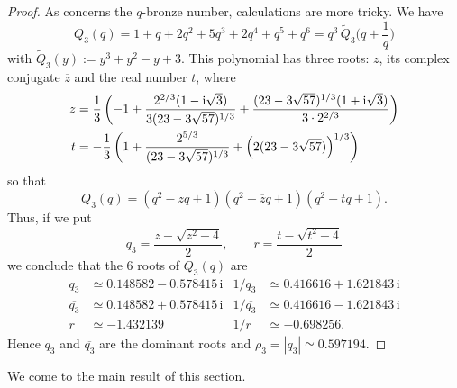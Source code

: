 \documentclass[11pt,reqno]{amsart}
\theoremstyle{plain}
\theoremstyle{definition}
\numberwithin{figure}{section}
\numberwithin{table}{section}
\numberwithin{equation}{section}
\newcommand{\ov}[1]{\overline {#1}}
\newcommand\ip{\ensuremath{\mathrm{i}}}
\let\fr=\frac
\begin{document}
\begin{proof}
As concerns the $q$-bronze number, calculations are more tricky. We have
\begin{equation*}
Q_3(q)=1+q+2q^2+5q^3+2q^4+q^5+q^6=q^3\,\widetilde Q_3\Bigr(q+\fr 1{q}\Bigr)
\end{equation*}
with $\widetilde Q_3(y):=y^3+y^2-y+3$. This polynomial has  three roots: $z$, its complex conjugate $\ov{z}$ and the real number $t$, where
\begin{align*}
z&= \fr 1{3}\left(-1+\fr{ 2^{2/3}(1-\ip\sqrt{3})}{3(23 - 3 \sqrt{57})^{1/3}}
+\fr{(23- 3 \sqrt{57})^{1/3}(1+\ip\sqrt{3})}{3\cdot 2^{2/3}}\right)\\
t&=-\fr 1{3}\left(1+\fr{2^{5/3}}{(23 - 3 \sqrt{57})^{1/3}}
+\Bigl(2(23- 3 \sqrt{57})\Bigr)^{1/3}\right)\\
\end{align*}
so that
\begin{equation*}
Q_3(q)=(q^2-zq+1)(q^2-\ov{z}q+1)(q^2-tq+1).
\end{equation*}
Thus, if we put 
\begin{equation*}
q_3=\fr{z-\sqrt{z^2-4}}{2},\qquad r=\fr{t-\sqrt{t^2-4}}{2}
\end{equation*}
we conclude that the 6 roots of $Q_3(q)$ are 
\begin{align*}
q_3&\simeq 0.148582 - 0.578415\,\ip & 1/q_3&\simeq 0.416616 + 1.621843\,\ip\\
\ov{q_3}&\simeq 0.148582 + 0.578415\,\ip & 1/\ov{q_3}&\simeq 0.416616 - 1.621843\,\ip\\
r&\simeq -1.432139 & 1/r&\simeq -0.698256.
\end{align*}
Hence $q_3$ and $\ov {q_3}$ are the dominant  roots and $\rho_3=|q_3|\simeq 0.597194$.
\end{proof}

We come to the main result of this section. 
\end{document}
